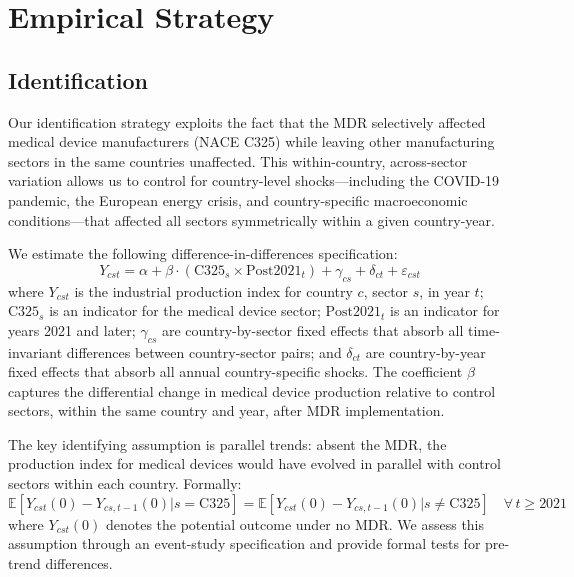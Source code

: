 \documentclass[12pt]{article}
\newcommand{\E}{\mathbb{E}}
\begin{document}




\section{Empirical Strategy}
\label{sec:strategy}

\subsection{Identification}

Our identification strategy exploits the fact that the MDR selectively affected medical device manufacturers (NACE C325) while leaving other manufacturing sectors in the same countries unaffected. This within-country, across-sector variation allows us to control for country-level shocks---including the COVID-19 pandemic, the European energy crisis, and country-specific macroeconomic conditions---that affected all sectors symmetrically within a given country-year.

We estimate the following difference-in-differences specification:
\begin{equation}
\label{eq:did}
Y_{cst} = \alpha + \beta \cdot (\text{C325}_s \times \text{Post2021}_t) + \gamma_{cs} + \delta_{ct} + \varepsilon_{cst}
\end{equation}
where $Y_{cst}$ is the industrial production index for country $c$, sector $s$, in year $t$; $\text{C325}_s$ is an indicator for the medical device sector; $\text{Post2021}_t$ is an indicator for years 2021 and later; $\gamma_{cs}$ are country-by-sector fixed effects that absorb all time-invariant differences between country-sector pairs; and $\delta_{ct}$ are country-by-year fixed effects that absorb all annual country-specific shocks. The coefficient $\beta$ captures the differential change in medical device production relative to control sectors, within the same country and year, after MDR implementation.

The key identifying assumption is parallel trends: absent the MDR, the production index for medical devices would have evolved in parallel with control sectors within each country. Formally:
\begin{equation}
\E[Y_{cst}(0) - Y_{cs,t-1}(0) | s = \text{C325}] = \E[Y_{cst}(0) - Y_{cs,t-1}(0) | s \neq \text{C325}] \quad \forall \, t \geq 2021
\end{equation}
where $Y_{cst}(0)$ denotes the potential outcome under no MDR. We assess this assumption through an event-study specification and provide formal tests for pre-trend differences.
\end{document}
